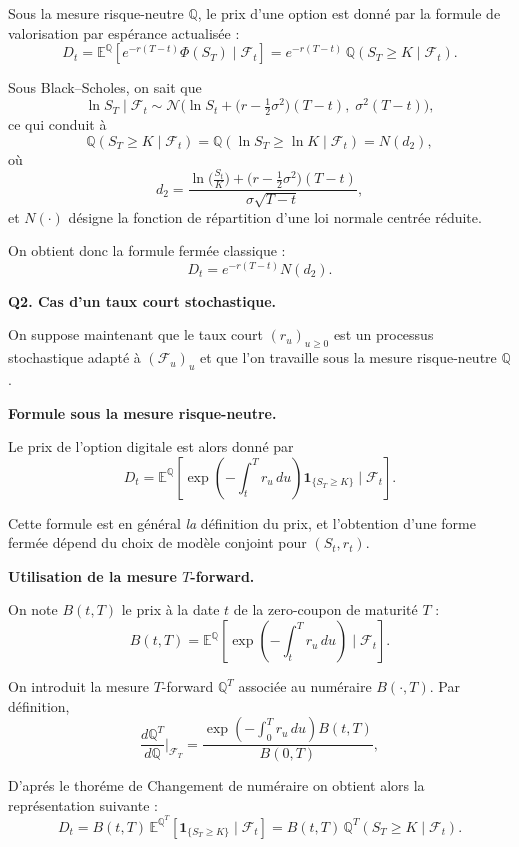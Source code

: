 Sous la mesure risque-neutre $\mathbb{Q}$, le prix d'une option est donné par la formule
de valorisation par espérance actualisée :
\[
D_t = \mathbb{E}^{\mathbb{Q}}\!\left[ e^{-r (T-t)} \Phi(S_T) \mid \mathcal{F}_t \right]
     = e^{-r (T-t)} \, \mathbb{Q}\!\left( S_T \ge K \mid \mathcal{F}_t \right).
\]

Sous Black--Scholes, on sait que
\[
\ln S_T \mid \mathcal{F}_t \sim \mathcal{N}\Big(
\ln S_t + \big(r - \tfrac{1}{2}\sigma^2\big)(T-t), \; \sigma^2 (T-t)
\Big),
\]
ce qui conduit à
\[
\mathbb{Q}(S_T \ge K \mid \mathcal{F}_t)
= \mathbb{Q}\!\left( \ln S_T \ge \ln K \mid \mathcal{F}_t \right)
= N(d_2),
\]
où
\[
d_2 = \frac{\ln\big(\frac{S_t}{K}\big) + \big(r - \tfrac{1}{2}\sigma^2\big)(T-t)}
           {\sigma \sqrt{T-t}},
\]
et $N(\cdot)$ désigne la fonction de répartition d'une loi normale centrée réduite.

On obtient donc la formule fermée classique :
\[
\boxed{
D_t = e^{-r (T-t)} N(d_2).
}
\]

\bigskip

\textbf{Q2. Cas d'un taux court stochastique.}

On suppose maintenant que le taux court $(r_u)_{u \ge 0}$ est un processus stochastique
adapté à $(\mathcal{F}_u)_u$ et que l'on travaille sous la mesure risque-neutre $\mathbb{Q}$.

\medskip

\textbf{Formule sous la mesure risque-neutre.}

Le prix de l'option digitale est alors donné par
\[
D_t = \mathbb{E}^{\mathbb{Q}}\!\left[
\exp\!\left(-\int_t^T r_u \, du\right) \mathbf{1}_{\{S_T \ge K\}}
\;\Big|\; \mathcal{F}_t
\right].
\]

Cette formule est en général \emph{la} définition du prix, et l'obtention d'une forme
fermée dépend du choix de modèle conjoint pour $(S_t, r_t)$.

\medskip

\textbf{Utilisation de la mesure $T$-forward.}

On note $B(t,T)$ le prix à la date $t$ de la zero-coupon de maturité $T$ :
\[
B(t,T) =
\mathbb{E}^{\mathbb{Q}}\!\left[
\exp\!\left(-\int_t^T r_u \, du\right)
\;\Big|\; \mathcal{F}_t
\right].
\]

On introduit la mesure $T$-forward $\mathbb{Q}^T$ associée au numéraire $B(\cdot, T)$.
Par définition,
\[
\frac{d\mathbb{Q}^T}{d\mathbb{Q}}\Big|_{\mathcal{F}_T}
= \frac{\exp\!\left(-\int_0^T r_u \,du\right) B(t,T)}{B(0,T)},
\]

D'aprés le thoréme de Changement de numéraire on obtient alors la représentation suivante :
\[
D_t
= B(t,T)\, \mathbb{E}^{\mathbb{Q}^T}\!\left[
\mathbf{1}_{\{S_T \ge K\}} \mid \mathcal{F}_t
\right]
= B(t,T)\, \mathbb{Q}^T(S_T \ge K \mid \mathcal{F}_t).
\]

